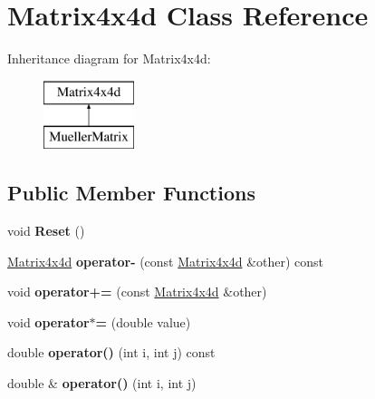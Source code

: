 \hypertarget{class_matrix4x4d}{}\section{Matrix4x4d Class Reference}
\label{class_matrix4x4d}
Inheritance diagram for Matrix4x4d\+:\begin{figure}[H]
\begin{center}
\leavevmode
\includegraphics[height=2.000000cm]{class_matrix4x4d}
\end{center}
\end{figure}
\subsection*{Public Member Functions}
\begin{DoxyCompactItemize}
\item 
\mbox{\label{class_matrix4x4d_a9f8882b7cf03d260103d5e9ffd2ff6fb}} 
void {\bfseries Reset} ()
\item 
\mbox{\label{class_matrix4x4d_a8c6221d46f27a0f9f7ad1b65f7de7085}} 
\mbox{\hyperlink{class_matrix4x4d}{Matrix4x4d}} {\bfseries operator-\/} (const \mbox{\hyperlink{class_matrix4x4d}{Matrix4x4d}} \&other) const
\item 
\mbox{\label{class_matrix4x4d_ac2a63d675429cae482db92c165a5a23b}} 
void {\bfseries operator+=} (const \mbox{\hyperlink{class_matrix4x4d}{Matrix4x4d}} \&other)
\item 
\mbox{\label{class_matrix4x4d_a42a09732f017713333e8bce2a0ef649c}} 
void {\bfseries operator$\ast$=} (double value)
\item 
\mbox{\label{class_matrix4x4d_a86228dbd8264f212ead840165add0089}} 
double {\bfseries operator()} (int i, int j) const
\item 
\mbox{\label{class_matrix4x4d_acae8b73e02a1878a08d97deceed333bf}} 
double \& {\bfseries operator()} (int i, int j)
\end{DoxyCompactItemize}
